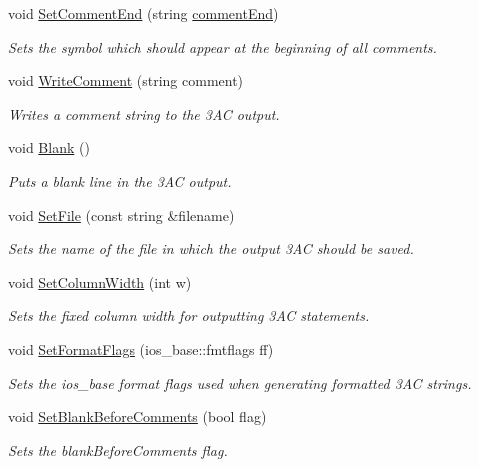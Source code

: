 \begin{DoxyCompactItemize}
\item 
void \hyperlink{classTAC__Generator_ad96d5a262c29a34a34324ed6c7aeffe1}{Set\-Comment\-End} (string \hyperlink{classTAC__Generator_a9f011cfb810ea2cd01b31b9a48762123}{comment\-End})
\begin{DoxyCompactList}\small\item\em Sets the symbol which should appear at the beginning of all comments. \end{DoxyCompactList}\item 
void \hyperlink{classTAC__Generator_a37a03e11321195b25600eb008b20b800}{Write\-Comment} (string comment)
\begin{DoxyCompactList}\small\item\em Writes a comment string to the 3\-A\-C output. \end{DoxyCompactList}\item 
\hypertarget{classTAC__Generator_a3351d9d0d43b7b33591ed556c0261b84}{void \hyperlink{classTAC__Generator_a3351d9d0d43b7b33591ed556c0261b84}{Blank} ()}\label{classTAC__Generator_a3351d9d0d43b7b33591ed556c0261b84}

\begin{DoxyCompactList}\small\item\em Puts a blank line in the 3\-A\-C output. \end{DoxyCompactList}\item 
void \hyperlink{classTAC__Generator_a1c8e7f2ace8e7e96b4a2a1909ca054fe}{Set\-File} (const string \&filename)
\begin{DoxyCompactList}\small\item\em Sets the name of the file in which the output 3\-A\-C should be saved. \end{DoxyCompactList}\item 
void \hyperlink{classTAC__Generator_a2268378a805c9722cf4693e97b67166e}{Set\-Column\-Width} (int w)
\begin{DoxyCompactList}\small\item\em Sets the fixed column width for outputting 3\-A\-C statements. \end{DoxyCompactList}\item 
void \hyperlink{classTAC__Generator_aacd4a0f0dd9c2cc79da4cf9d9d1e442e}{Set\-Format\-Flags} (ios\-\_\-base\-::fmtflags ff)
\begin{DoxyCompactList}\small\item\em Sets the ios\-\_\-base format flags used when generating formatted 3\-A\-C strings. \end{DoxyCompactList}\item 
void \hyperlink{classTAC__Generator_a6d909e88feeb387d89ee154aeb6466f2}{Set\-Blank\-Before\-Comments} (bool flag)
\begin{DoxyCompactList}\small\item\em Sets the blank\-Before\-Comments flag. \end{DoxyCompactList}\end{DoxyCompactItemize}
